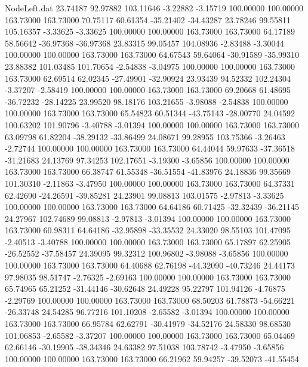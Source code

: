 \begin{filecontents}{NodeLeft.dat}
  23.74187   92.97882  103.11646    -3.22882   -3.15719  100.00000  100.00000  163.73000  163.73000   70.75117   60.61354  -35.21402  -34.43287
  23.78246   99.55811  105.16357    -3.33625   -3.33625  100.00000  100.00000  163.73000  163.73000   64.17189   58.56642  -36.97368  -36.97368
  23.83315   99.05457  104.08936    -2.83488   -3.30044  100.00000  100.00000  163.73000  163.73000   64.67543   59.64064  -30.91589  -35.99310
  23.88382  101.03485  101.70654    -2.54838   -3.04975  100.00000  100.00000  163.73000  163.73000   62.69514   62.02345  -27.49901  -32.90924
  23.93439   94.52332  102.24304    -3.37207   -2.58419  100.00000  100.00000  163.73000  163.73000   69.20668   61.48695  -36.72232  -28.14225
  23.99520   98.18176  103.21655    -3.98088   -2.54838  100.00000  100.00000  163.73000  163.73000   65.54823   60.51344  -43.75143  -28.00770
  24.04592  100.63202  101.90796    -3.40788   -3.01394  100.00000  100.00000  163.73000  163.73000   63.09798   61.82204  -38.29132  -33.86499
  24.08671   99.28955  103.75366    -3.26463   -2.72744  100.00000  100.00000  163.73000  163.73000   64.44044   59.97633  -37.36518  -31.21683
  24.13769   97.34253  102.17651    -3.19300   -3.65856  100.00000  100.00000  163.73000  163.73000   66.38747   61.55348  -36.51554  -41.83976
  24.18836   99.35669  101.30310    -2.11863   -3.47950  100.00000  100.00000  163.73000  163.73000   64.37331   62.42690  -24.26591  -39.85281
  24.23901   99.08813  103.01575    -2.97813   -3.33625  100.00000  100.00000  163.73000  163.73000   64.64186   60.71425  -32.32439  -36.21145
  24.27967  102.74689   99.08813    -2.97813   -3.01394  100.00000  100.00000  163.73000  163.73000   60.98311   64.64186  -32.95898  -33.35532
  24.33020   98.55103  101.47095    -2.40513   -3.40788  100.00000  100.00000  163.73000  163.73000   65.17897   62.25905  -26.52552  -37.58457
  24.39095   99.32312  100.96802    -3.98088   -3.65856  100.00000  100.00000  163.73000  163.73000   64.40688   62.76198  -44.32090  -40.73246
  24.44173   97.98035   98.51747    -2.76325   -2.69163  100.00000  100.00000  163.73000  163.73000   65.74965   65.21252  -31.44146  -30.62648
  24.49228   95.22797  101.94126    -4.76875   -2.29769  100.00000  100.00000  163.73000  163.73000   68.50203   61.78873  -54.66221  -26.33748
  24.54285   96.77216  101.10208    -2.65582   -3.01394  100.00000  100.00000  163.73000  163.73000   66.95784   62.62791  -30.41979  -34.52176
  24.58330   98.68530  101.06853    -2.65582   -3.37207  100.00000  100.00000  163.73000  163.73000   65.04469   62.66146  -30.19905  -38.34346
  24.63382   97.51038  103.78742    -3.47950   -3.65856  100.00000  100.00000  163.73000  163.73000   66.21962   59.94257  -39.52073  -41.55454

\end{filecontents}
